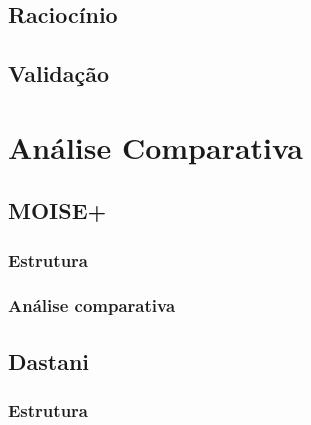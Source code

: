 \documentclass[openright]{normas-utf-tex} %
\begin{document}
			

	\section{Raciocínio}

			
	
	\section{Validação}

			

\chapter{Análise Comparativa}

	

	\section{MOISE+}
	
		

		\subsection{Estrutura}

		
	

		\subsection{Análise comparativa}

			

	\section{Dastani}

		

		\subsection{Estrutura}

			
\end{document}
